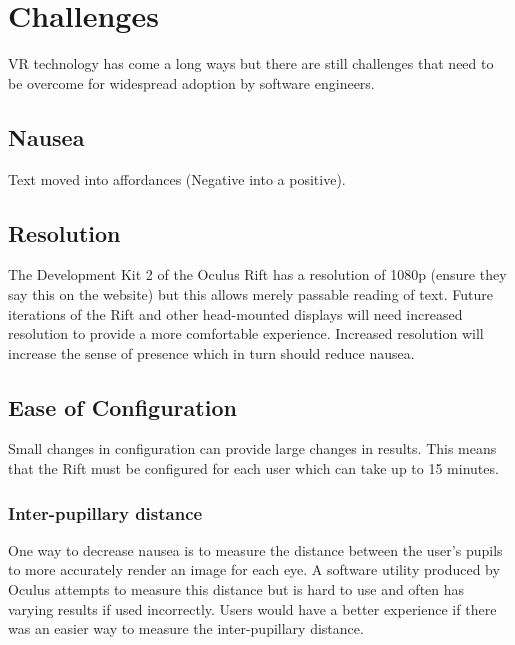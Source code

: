 \documentclass[conference]{IEEEtran}
\begin{document}
\section{Challenges}
VR technology has come a long ways but there are still challenges that need to be overcome for widespread adoption by software engineers.

\subsection{Nausea}
Text moved into affordances (Negative into a positive).

\subsection{Resolution}
The Development Kit 2 of the Oculus Rift has a resolution of 1080p (ensure they say this on the website) but this allows merely passable reading of text. 
Future iterations of the Rift and other head-mounted displays will need increased resolution to provide a more comfortable experience.
Increased resolution will increase the sense of presence which in turn should reduce nausea.

\subsection{Ease of Configuration}
Small changes in configuration can provide large changes in results.
This means that the Rift must be configured for each user which can take up to 15 minutes.

\subsubsection{Inter-pupillary distance}
One way to decrease nausea is to measure the distance between the user's pupils to more accurately render an image for each eye.
A software utility produced by Oculus attempts to measure this distance but is hard to use and often has varying results if used incorrectly.
Users would have a better experience if there was an easier way to measure the inter-pupillary distance.
\end{document}
